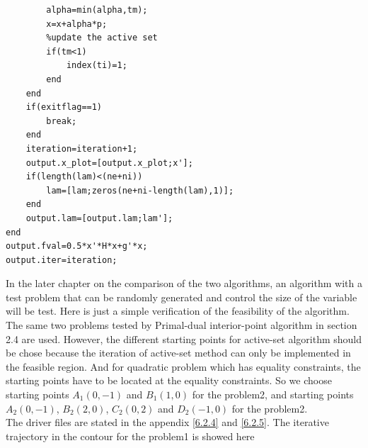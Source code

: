 {\begin{lstlisting}
        alpha=min(alpha,tm);
        x=x+alpha*p;
        %update the active set
        if(tm<1)
            index(ti)=1;
        end
    end
    if(exitflag==1)
        break;
    end
    iteration=iteration+1;
    output.x_plot=[output.x_plot;x'];
    if(length(lam)<(ne+ni))
        lam=[lam;zeros(ne+ni-length(lam),1)];
    end
    output.lam=[output.lam;lam'];
end
output.fval=0.5*x'*H*x+g'*x;
output.iter=iteration;
\end{lstlisting}}
In the later chapter on the comparison of the two algorithms, an algorithm with a test problem that can be randomly generated and control the size of the variable will be test. Here is just a simple verification of the feasibility of the algorithm.\\
The same two problems tested by Primal-dual interior-point algorithm in section 2.4 are used. However, the different starting points for active-set algorithm should be chose because the iteration of active-set method can only be implemented in the feasible region. And for quadratic problem which has equality constraints, the starting points have to be located at the equality constraints. So we choose starting points $A_1(0,-1)$ and $B_1(1,0)$ for the problem2, and starting points $A_2(0,-1)$, $B_2(2,0)$, $C_2(0,2)$ and $D_2(-1,0)$ for the problem2.\\[0.3cm]
The driver files are stated in the appendix \ref{6.2.4} and \ref{6.2.5}. The iterative trajectory in the contour for the problem1 is showed here

